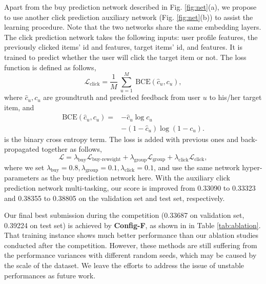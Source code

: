 Apart from the buy prediction network described in Fig. \ref{fig:net}(a), we propose to use another click prediction auxiliary network (Fig. \ref{fig:net}(b)) to assist the learning procedure.
Note that the two networks share the same embedding layers.
%
The click prediction network takes the following inputs: user profile features, the previously clicked items' id and features, target items' id, and features. It is trained to predict whether the user will click the target item or not.
The loss function is defined as follows,
\begin{equation}
    \mathcal{L}_{\text{click}} = \frac{1}{M} ~\overset{M}{\underset{u=1}{\sum}}
        ~\text{BCE}(\hat{c}_{u}, c_{u}),
\end{equation}
where $\hat{c}_{u}, c_{u}$ are groundtruth and predicted feedback from user $u$ to his/her target item, and
\begin{equation}
\begin{aligned}
    \text{BCE}(\hat{c}_{u}, c_{u}) = 
        &- \hat{c}_{u} \log c_{u}\\
        &- (1-\hat{c}_{u}) \log (1-c_{u}).
\end{aligned}
\end{equation}
is the binary cross entropy term.
The loss is added with previous ones and back-propagated together as follows,
\begin{equation}
    \mathcal{L} = 
    \lambda_{\text{buy}} \mathcal{L}_{\text{buy-reweight}} + 
    \lambda_{\text{group}} \mathcal{L}_{\text{group}} + 
    \lambda_{\text{click}} \mathcal{L}_{\text{click}},
\end{equation}
where we set $\lambda_{\text{buy}}=0.8, \lambda_{\text{group}}=0.1, \lambda_{\text{click}}=0.1$, and use the same network hyper-parameters as the buy prediction network here.
With the auxiliary click prediction network multi-tasking, our score is improved from 0.33090 to 0.33323 and 0.38355 to 0.38805 on the validation set and test set, respectively.
%

Our final best submission during the competition (0.33687 on validation set, 0.39224 on test set) is achieved by \textbf{Config-F}, as shown in in Table \ref{tab:ablation}.
That training instance shows much better performance than our ablation studies conducted after the competition. 
However, these methods are still suffering from the performance variances with different random seeds, which may be caused by the scale of the dataset.
We leave the efforts to address the issue of unstable performances as future work.


